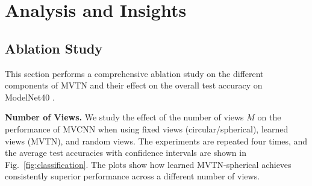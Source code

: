 \documentclass[10pt,twocolumn,letterpaper]{article}
\newcommand{\figLabel}{Fig.~}
\newcommand{\mysection}[1]{\noindent\textbf{#1.}}
\begin{document}
\begin{table}[t]

\tabcolsep=0.15cm
\centering
{}
\vspace{2pt}
\caption{\small\textbf{Occlusion Robustness of 3D Methods.} We report the test accuracy on point cloud ModelNet40 for different occlusion ratios of the data to measure occlusion robustness of different 3D methods. MVTN achieves 13\% better accuracy than PointNet (a robust network) when half of the object is occluded.}
\label{tbl:occlusion}
\end{table}




\section{Analysis and Insights} \label{sec:analysis}
\subsection{Ablation Study} \label{sec:ablation}
\vspace{-4pt}
This section performs a comprehensive ablation study on the different components of MVTN and their effect on the overall test accuracy on ModelNet40 \cite{modelnet}.

\mysection{Number of Views} \label{sec:views}
We study the effect of the number of views $M$ on the performance of MVCNN when using fixed views (circular/spherical), learned views (MVTN), and random views.
The experiments are repeated four times, and the average test accuracies with confidence intervals are shown in  \figLabel{\ref{fig:classification}}. 
 The plots show how learned MVTN-spherical achieves consistently superior performance across a different number of views. 
\end{document}
